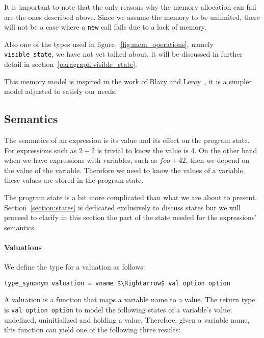 It is important to note that the only reasons why the memory allocation can fail are the ones described above.
Since we assume the memory to be unlimited, there will not be a case where a \verb|new| call fails due to a lack of memory.


Also one of the types used in figure ~\ref{fig:mem_operations}, namely \verb|visible_state|, we have not yet talked about, it will be discussed in further detail in section~\ref{paragraph:visible_state}.

This memory model is inspired in the work of Blazy and Leroy~\parencite{compcert}, it is a simpler model adjusted to satisfy our needs.


\subsection{Semantics}\label{subsection:semantics_expressions}

The semantics of an expression is its value and its effect on the program state.
For expressions such as $2 + 2$ is trivial to know the value is $4$.
On the other hand when we have expressions with variables, such as $foo + 42$, then we depend on the value of the variable.
Therefore we need to know the values of a variable, these values are stored in the program state.

The program state is a bit more complicated than what we are about to present.
Section~\ref{section:states} is dedicated exclusively to discuss states but we will proceed to clarify in this section the part of the state needed for the expressions' semantics.

\paragraph{Valuations}\label{paragraph:valuation}

We define the type for a valuation as follows:

\begin{lstlisting}[frame=single, mathescape=true]
type_synonym valuation = vname $\Rightarrow$ val option option
\end{lstlisting}

A valuation is a function that maps a variable name to a value.
The return type is \verb|val option option| to model the following states of a variable's value: undefined, uninitialized and holding a value.
Therefore, given a variable name, this function can yield one of the following three results:

